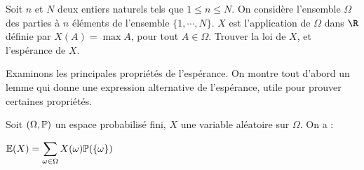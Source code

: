 \documentclass[12pt,a4paper]{report}
\begin{document}
\begin{exemple}[Exercice 11]{}
Soit $n$ et $N$ deux entiers naturels tels que $1 \le n \le N$. On considère l'ensemble $\Omega$ des parties à $n$ éléments de l'ensemble $\{1,\cdots,N\}$. $X$ est l'application de $\Omega$ dans $\R$ définie par $X(A) = \max A$, pour tout $A \in \Omega$. Trouver la loi de $X$, et l'espérance de $X$.
\end{exemple}

Examinons les principales propriétés de l'espérance. On montre tout d'abord un lemme qui donne une expression alternative de l'espérance, utile pour prouver certaines propriétés.

\begin{lemme}{}{}
Soit $(\Omega,\mathbb{P})$ un espace probabilisé fini, $X$ une variable aléatoire sur $\Omega$. On a :
\begin{center}
$\mathbb{E}(X) = \displaystyle \sum_{\omega \in \Omega} X(\omega) \mathbb{P}(\{\omega\})$
\end{center}
\end{lemme}
\end{document}
